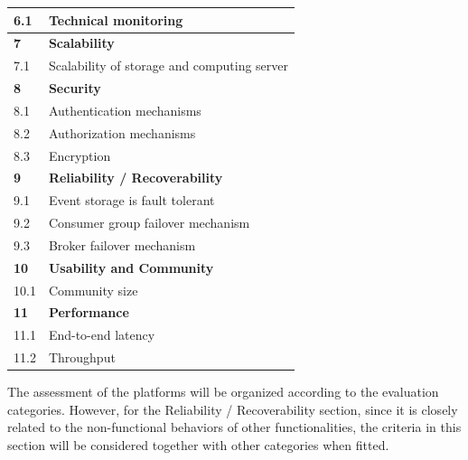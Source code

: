 \begin{table}[h]
\begin{tabular}{|l|l|}
		6.1          & Technical monitoring                                     \\ \hline
		\textbf{7}   & \textbf{Scalability}                                     \\ \hline
		7.1          & Scalability of storage and computing server              \\ \hline
		\textbf{8}   & \textbf{Security}                                        \\ \hline
		8.1          & Authentication mechanisms                                \\ \hline
		8.2          & Authorization mechanisms                                 \\ \hline
		8.3          & Encryption                                               \\ \hline
		\textbf{9}  & \textbf{Reliability / Recoverability}                    \\ \hline
		9.1         & Event storage is fault tolerant                          \\ \hline
		9.2         & Consumer group failover mechanism                        \\ \hline
		9.3         & Broker failover mechanism                                \\ \hline
		\textbf{10}  & \textbf{Usability and Community}                         \\ \hline
		10.1         & Community size                                           \\ \hline
		\textbf{11}  & \textbf{Performance}                                     \\ \hline
		11.1         & End-to-end latency                                       \\ \hline
		11.2         & Throughput                                               \\ \hline
	\end{tabular}
\end{table}

The assessment of the platforms will be organized according to the evaluation categories. However, for the Reliability / Recoverability section, since it is closely related to the non-functional behaviors of other functionalities, the criteria in this section will be considered together with other categories when fitted.





